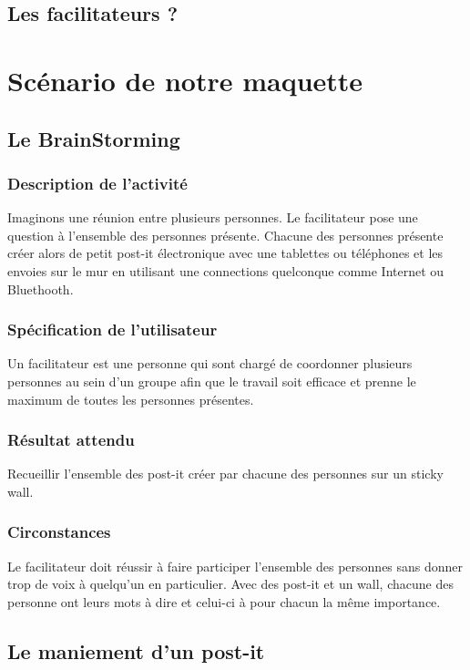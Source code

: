 \documentclass{article}
\begin{document}
\subsection{Les facilitateurs ?}

\section{Scénario de notre maquette}

\subsection{Le BrainStorming}
\subsubsection{Description de l’activité}
Imaginons une réunion entre plusieurs personnes. Le facilitateur pose une question à l'ensemble des personnes présente. Chacune des personnes présente créer alors de petit post-it électronique avec une tablettes ou téléphones et les envoies sur le mur en utilisant une connections quelconque comme Internet ou Bluethooth.
\subsubsection{Spécification de l’utilisateur}
Un facilitateur est une personne qui sont chargé de coordonner plusieurs personnes au sein d'un groupe afin que le travail soit efficace et prenne le maximum de toutes les personnes présentes.
\subsubsection{Résultat attendu}
Recueillir l'ensemble des post-it créer par chacune des personnes sur un sticky wall.
\subsubsection{Circonstances}
Le facilitateur doit réussir à faire participer l'ensemble des personnes sans donner trop de voix à quelqu'un en particulier. Avec des post-it et un wall, chacune des personne ont leurs mots à dire et celui-ci à pour chacun la même importance.

\subsection{Le maniement d'un post-it}
\end{document}
